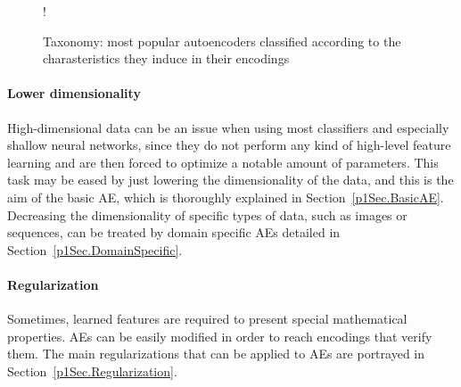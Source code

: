\begin{figure}[htp!]
	\centering
	\resizebox {\linewidth} {!} {
	}
	\caption{Taxonomy: most popular autoencoders classified according to the charasteristics they induce in their encodings}
	\label{p1fig:autoencoder-taxonomy}
\end{figure}

\paragraph{Lower dimensionality}
High-dimensional data can be an issue when using most classifiers and especially shallow neural networks, since they do not perform any kind of high-level feature learning and are then forced to optimize a notable amount of parameters. This task may be eased by just lowering the dimensionality of the data, and this is the aim of the basic AE, which is thoroughly explained in Section~\ref{p1Sec.BasicAE}. Decreasing the dimensionality of specific types of data, such as images or sequences, can be treated by domain specific AEs detailed in Section~\ref{p1Sec.DomainSpecific}.

\paragraph{Regularization}
Sometimes, learned features are required to present special mathematical properties. AEs can be easily modified in order to reach encodings that verify them. The main regularizations that can be applied to AEs are portrayed in Section~\ref{p1Sec.Regularization}.

